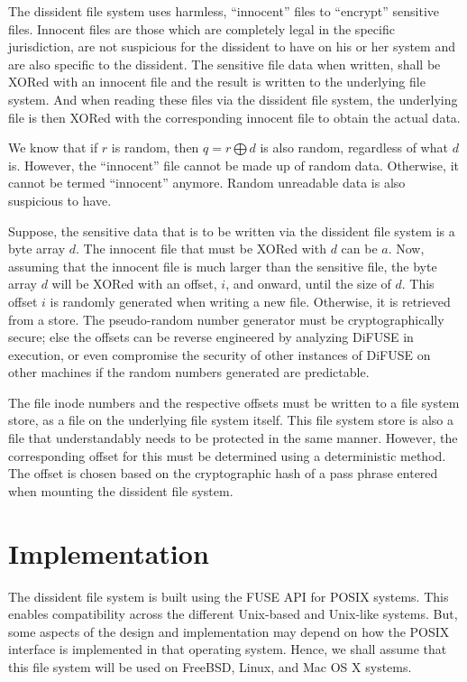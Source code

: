 \documentclass[10pt,twocolumn]{article}
\begin{document}
The dissident file system uses harmless, ``innocent'' files to ``encrypt'' sensitive files. Innocent files are those which are completely legal in the specific jurisdiction, are not suspicious for the dissident to have on his or her system and are also specific to the dissident. The sensitive file data when written, shall be XORed with an innocent file and the result is written to the underlying file system. And when reading these files via the dissident file system, the underlying file is then XORed with the corresponding innocent file to obtain the actual data. 

We know that if $\mathit{r}$ is random, then $\mathit{q = r \bigoplus d}$ is also random, regardless of what $\mathit{d}$ is. However, the ``innocent'' file cannot be made up of random data. Otherwise, it cannot be termed “innocent” anymore. Random unreadable data is also suspicious to have. 

Suppose, the sensitive data that is to be written via the dissident file system is a byte array $d$. The innocent file that must be XORed with $d$ can be $a$. Now, assuming that the innocent file is much larger than the sensitive file, the byte array $d$ will be XORed with an offset, $i$, and onward, until the size of $d$. This offset $i$ is randomly generated when writing a new file. Otherwise, it is retrieved from a store. The pseudo-random number generator must be cryptographically secure; else the offsets can be reverse engineered by analyzing DiFUSE in execution, or even compromise the security of other instances of DiFUSE on other machines if the random numbers generated are predictable. 

The file inode numbers and the respective offsets must be written to a file system store, as a file on the underlying file system itself. This file system store is also a file that understandably needs to be protected in the same manner. However, the corresponding offset for this must be determined using a deterministic method. The offset is chosen based on the cryptographic hash of a pass phrase entered when mounting the dissident file system. 

\section{Implementation}

The dissident file system is built using the FUSE API for POSIX systems. This enables compatibility across the different Unix-based and Unix-like systems. But, some aspects of the design and implementation may depend on how the POSIX interface is implemented in that operating system. Hence, we shall assume that this file system will be used on FreeBSD, Linux, and Mac OS X systems. 
\end{document}
